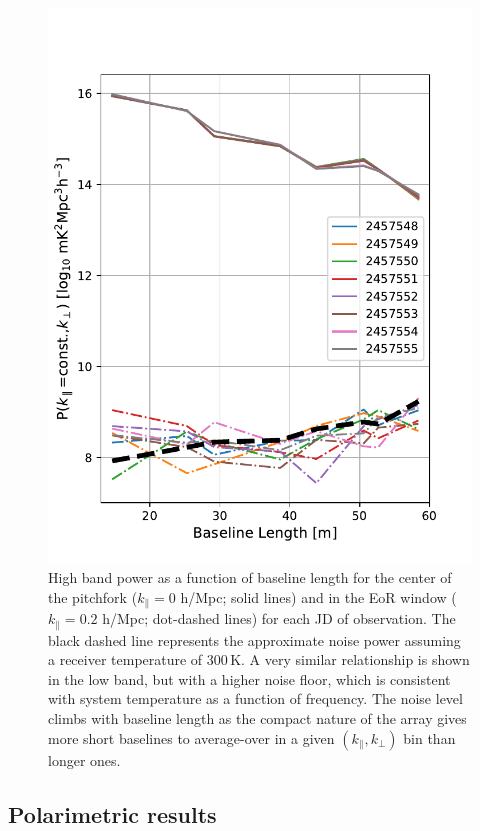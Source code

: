 \documentclass[twocolumn, trackchanges]{aastex61}
\begin{document}
\begin{figure}
\centering
\includegraphics[scale=0.5]{highband_by_day.pdf}
\caption{High band power as a function of baseline length for the center of the pitchfork ($k_{\parallel}=0$ h/Mpc; solid lines) and in the EoR window ($k_{\parallel}=0.2$ h/Mpc; dot-dashed lines) for  each JD of observation. The black dashed line represents the approximate noise power assuming a receiver temperature of 300\,K. A very similar relationship is shown in the low band, but with a higher noise floor, which is consistent with system temperature as a function of frequency. The noise level climbs with baseline length as the compact nature of the array gives more short baselines to average-over in a given $(k_{\parallel},k_{\perp})$ bin than longer ones.}
\label{fig:highband_cuts_per_day}
\end{figure}

\subsection{Polarimetric results}
\label{subsec:polarimetric_results}
\end{document}
